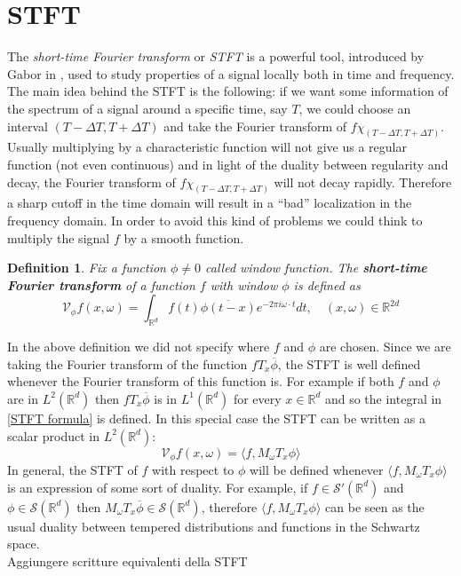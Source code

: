 \documentclass[corpo=11pt, stile=classica, tipotesi=custom,
greek, evenboxes, english]{toptesi}
\numberwithin{equation}{chapter}
\newtheorem{defi}[teo]{Definition}
\newcommand{\R}{\mathbb{R}} %
\newcommand{\V}{\mathcal{V}} %
\begin{document}
\section{STFT}\label{section STFT}
{\color{red}The \emph{short-time Fourier transform} or \emph{STFT} is a powerful tool, introduced by Gabor in \cite{gabor}, used to study properties of a signal locally both in time and frequency. The main idea behind the STFT is the following: if we want some information of the spectrum of a signal around a specific time, say $T$, we could choose an interval $(T-\Delta T, T + \Delta T)$ and take the Fourier transform of $f \chi_{(T-\Delta T, T + \Delta T)}$. Usually multiplying by a characteristic function will not give us a regular function (not even continuous) and in light of the duality between regularity and decay, the Fourier transform of $f \chi_{(T-\Delta T, T + \Delta T)}$ will not decay rapidly. Therefore a sharp cutoff in the time domain will result in a ``bad'' localization in the frequency domain. In order to avoid this kind of problems we could think to multiply the signal $f$ by a smooth function.}
\begin{defi}\label{STFT def}
	Fix a function $\phi \neq 0$ called \emph{window function}. The \textbf{short-time Fourier transform} of a function $f$ with window $\phi$ is defined as
	\begin{equation}\label{STFT formula}
		\V_{\phi}f(x,\omega) = \int_{\R^d} f(t)\overline{\phi(t-x)}e^{-2 \pi i \omega \cdot t} dt, \quad (x,\omega) \in \R^{2d}
	\end{equation}
\end{defi}
In the above definition we did not specify where $f$ and $\phi$ are chosen. Since we are taking the Fourier transform of the function $f T_x\overline{\phi}$, the STFT is well defined whenever the Fourier transform of this function is. For example if both $f$ and $\phi$ are in $L^2(\R^d)$ then $f T_x\overline{\phi}$ is in $L^1(\R^d)$ for every $x \in \R^d$ and so the integral in \eqref{STFT formula} is defined. In this special case the STFT can be written as a scalar product in $L^2(\R^d)$:
\begin{equation*}
	\V_{\phi}f(x,\omega) = \langle f, M_{\omega} T_x \phi \rangle
\end{equation*}
In general, the STFT of $f$ with respect to $\phi$ will be defined whenever  $\langle f, M_{\omega} T_x \phi \rangle$ is an expression of some sort of duality. For example, if $f \in \mathcal{S}'(\R^d)$ and $\phi \in \mathcal{S}(\R^d)$ then $M_{\omega} T_x \overline{\phi} \in \mathcal{S}(\R^d)$, therefore $\langle f, M_{\omega} T_x \phi \rangle$ can be seen as the usual duality between tempered distributions and functions in the Schwartz space.\\
{\color{blue} Aggiungere scritture equivalenti della STFT}
\end{document}

